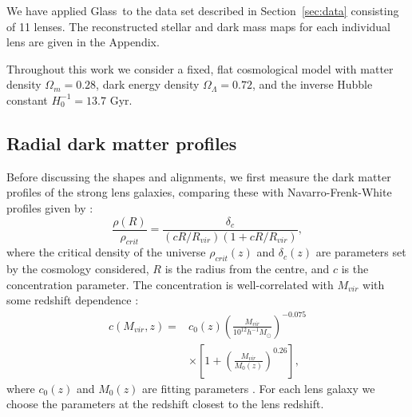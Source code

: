 \documentclass[useAMS,usenatbib]{mn2e}
\def\Glass{{\sc Glass}}
\begin{document}
We have applied \Glass\ to the data set described in Section~\ref{sec:data} consisting of 11 lenses. The reconstructed stellar and dark mass maps for each individual lens are given in the Appendix.

Throughout this work we consider a fixed, flat cosmological model with matter density $\Omega_{m} = 0.28$, dark energy density $\Omega_{\Lambda} = 0.72$, and the inverse Hubble constant $H_{0}^{-1} = 13.7$ Gyr.

\subsection{Radial dark matter profiles}\label{sec:radialprofiles}
Before discussing the shapes and alignments, we first measure the dark matter profiles of the strong lens galaxies, comparing these with Navarro-Frenk-White profiles \citep[NFW;][]{1996ApJ...462..563N} given by \citep{2011ApJ...740..102K}:
\begin{equation}\label{eq:nfw}
   \frac{\rho(R)}{\rho_{crit}} = \frac{\delta_{c}}{(cR/R_{vir})(1+cR/R_{vir})},
\end{equation}
where the critical density of the universe $\rho_{crit}(z)$ and $\delta_{c}(z)$ are parameters set by the cosmology considered, $R$ is the radius from the centre, and $c$ is the concentration parameter. The concentration is well-correlated with $M_{vir}$ with some redshift dependence \citep{2011ApJ...740..102K}: 
\begin{equation}\label{eq:concentration}
 \begin{split}
   c(M_{vir}, z) = & c_{0}(z)\left(\frac{M_{vir}}{10^{12}h^{-1}M_{\odot}}\right)^{-0.075} \\ & \times \left[1+\left(\frac{M_{vir}}{M_{0}(z)}\right)^{0.26}\right],
 \end{split}
\end{equation}
where $c_{0}(z)$ and $M_{0}(z)$ are fitting parameters \citep[see Table 3 of][]{2011ApJ...740..102K}. For each lens galaxy we choose the parameters at the redshift closest to the lens redshift.
\end{document}
